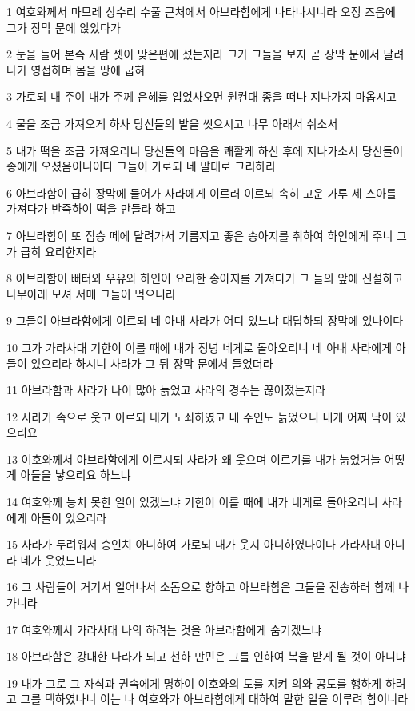 \par 1 여호와께서 마므레 상수리 수풀 근처에서 아브라함에게 나타나시니라 오정 즈음에 그가 장막 문에 앉았다가
\par 2 눈을 들어 본즉 사람 셋이 맞은편에 섰는지라 그가 그들을 보자 곧 장막 문에서 달려나가 영접하며 몸을 땅에 굽혀
\par 3 가로되 내 주여 내가 주께 은혜를 입었사오면 원컨대 종을 떠나 지나가지 마옵시고
\par 4 물을 조금 가져오게 하사 당신들의 발을 씻으시고 나무 아래서 쉬소서
\par 5 내가 떡을 조금 가져오리니 당신들의 마음을 쾌활케 하신 후에 지나가소서 당신들이 종에게 오셨음이니이다 그들이 가로되 네 말대로 그리하라
\par 6 아브라함이 급히 장막에 들어가 사라에게 이르러 이르되 속히 고운 가루 세 스아를 가져다가 반죽하여 떡을 만들라 하고
\par 7 아브라함이 또 짐승 떼에 달려가서 기름지고 좋은 송아지를 취하여 하인에게 주니 그가 급히 요리한지라
\par 8 아브라함이 뻐터와 우유와 하인이 요리한 송아지를 가져다가 그 들의 앞에 진설하고 나무아래 모셔 서매 그들이 먹으니라
\par 9 그들이 아브라함에게 이르되 네 아내 사라가 어디 있느냐 대답하되 장막에 있나이다
\par 10 그가 가라사대 기한이 이를 때에 내가 정녕 네게로 돌아오리니 네 아내 사라에게 아들이 있으리라 하시니 사라가 그 뒤 장막 문에서 들었더라
\par 11 아브라함과 사라가 나이 많아 늙었고 사라의 경수는 끊어졌는지라
\par 12 사라가 속으로 웃고 이르되 내가 노쇠하였고 내 주인도 늙었으니 내게 어찌 낙이 있으리요
\par 13 여호와께서 아브라함에게 이르시되 사라가 왜 웃으며 이르기를 내가 늙었거늘 어떻게 아들을 낳으리요 하느냐
\par 14 여호와께 능치 못한 일이 있겠느냐 기한이 이를 때에 내가 네게로 돌아오리니 사라에게 아들이 있으리라
\par 15 사라가 두려워서 승인치 아니하여 가로되 내가 웃지 아니하였나이다 가라사대 아니라 네가 웃었느니라
\par 16 그 사람들이 거기서 일어나서 소돔으로 향하고 아브라함은 그들을 전송하러 함께 나가니라
\par 17 여호와께서 가라사대 나의 하려는 것을 아브라함에게 숨기겠느냐
\par 18 아브라함은 강대한 나라가 되고 천하 만민은 그를 인하여 복을 받게 될 것이 아니냐
\par 19 내가 그로 그 자식과 권속에게 명하여 여호와의 도를 지켜 의와 공도를 행하게 하려고 그를 택하였나니 이는 나 여호와가 아브라함에게 대하여 말한 일을 이루려 함이니라

